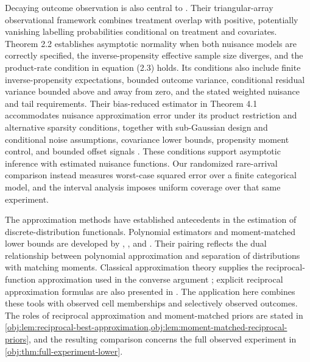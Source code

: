 \documentclass[11pt]{article}
\begin{document}
Decaying outcome observation is also central to \citet[Theorems 2.2 and 4.1, equation (2.3)]{ZhangChakraborttyBradic2025}. Their triangular-array observational framework combines treatment overlap with positive, potentially vanishing labelling probabilities conditional on treatment and covariates. Theorem 2.2 establishes asymptotic normality when both nuisance models are correctly specified, the inverse-propensity effective sample size diverges, and the product-rate condition in equation (2.3) holds. Its conditions also include finite inverse-propensity expectations, bounded outcome variance, conditional residual variance bounded above and away from zero, and the stated weighted nuisance and tail requirements. Their bias-reduced estimator in Theorem 4.1 accommodates nuisance approximation error under its product restriction and alternative sparsity conditions, together with sub-Gaussian design and conditional noise assumptions, covariance lower bounds, propensity moment control, and bounded offset signals \citep[Assumptions 1--3 and 5--8]{ZhangChakraborttyBradic2025}. These conditions support asymptotic inference with estimated nuisance functions. Our randomized rare-arrival comparison instead measures worst-case squared error over a finite categorical model, and the interval analysis imposes uniform coverage over that same experiment.

The approximation methods have established antecedents in the estimation of discrete-distribution functionals. Polynomial estimators and moment-matched lower bounds are developed by \citet{JiaoVenkatHanWeissman2015}, \citet{Wu2016}, and \citet{WuYang2019}. Their pairing reflects the dual relationship between polynomial approximation and separation of distributions with matching moments. Classical approximation theory supplies the reciprocal-function approximation used in the converse argument \citep{Meinardus1967}; explicit reciprocal approximation formulas are also presented in \citet[Section 3]{https://doi.org/10.1007/s11075-026-02364-1}. The application here combines these tools with observed cell memberships and selectively observed outcomes. The roles of reciprocal approximation and moment-matched priors are stated in \cref{obj:lem:reciprocal-best-approximation,obj:lem:moment-matched-reciprocal-priors}, and the resulting comparison concerns the full observed experiment in \cref{obj:thm:full-experiment-lower}.
\end{document}

